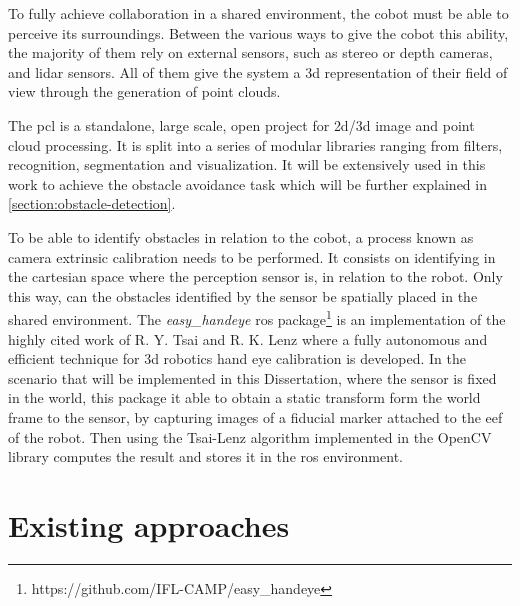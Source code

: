 \par To fully achieve collaboration in a shared environment, the cobot must be able to perceive its surroundings. Between the various ways to give the cobot this ability, the majority of them rely on external sensors, such as stereo or depth cameras, and lidar sensors. All of them give the system a \acs{3d} representation of their field of view through the generation of point clouds.
\par The \ac{pcl} \cite{pcl} is a standalone, large scale, open project for \acs{2d}/\acs{3d} image and point cloud processing. It is split into a series of modular libraries ranging from filters, recognition, segmentation and visualization. It will be extensively used in this work to achieve the obstacle avoidance task which will be further explained in \autoref{section:obstacle-detection}.
\par To be able to identify obstacles in relation to the cobot, a process known as camera extrinsic calibration needs to be performed. It consists on identifying in the cartesian space where the perception sensor is, in relation to the robot. Only this way, can the obstacles identified by the sensor be spatially placed in the shared environment. The \textit{easy\_handeye} \ac{ros} package\footnote{https://github.com/IFL-CAMP/easy\_handeye} is an implementation of the highly cited work of R. Y. Tsai and R. K. Lenz \cite{handeye} where a fully autonomous and efficient technique for \acs{3d} robotics hand eye calibration is developed. In the scenario that will be implemented in this Dissertation, where the sensor is fixed in the world, this package it able to obtain a static transform form the world frame to the sensor, by capturing images of a fiducial marker attached to the \ac{eef} of the robot. Then using the Tsai-Lenz algorithm implemented in the OpenCV library computes the result and stores it in the \ac{ros} environment.


\section{Existing approaches}

